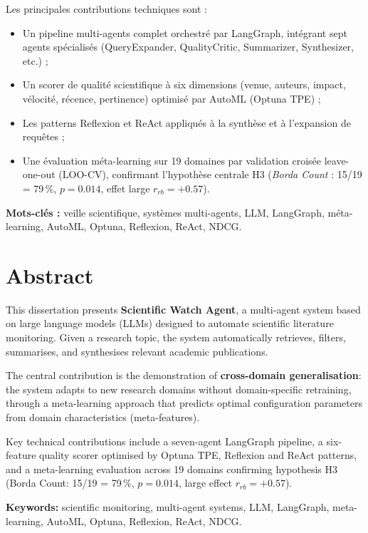 \documentclass[12pt,a4paper,twoside]{report}
\begin{document}
Les principales contributions techniques sont :
\begin{itemize}
  \item Un pipeline multi-agents complet orchestré par LangGraph, intégrant sept
    agents spécialisés (QueryExpander, QualityCritic, Summarizer, Synthesizer, etc.) ;
  \item Un scorer de qualité scientifique à six dimensions (venue, auteurs, impact,
    vélocité, récence, pertinence) optimisé par AutoML (Optuna TPE) ;
  \item Les patterns Reflexion et ReAct appliqués à la synthèse et à l'expansion
    de requêtes ;
  \item Une évaluation méta-learning sur 19 domaines par validation croisée
    leave-one-out (LOO-CV), confirmant l'hypothèse centrale H3
    (\textit{Borda Count} : 15/19 = 79\,\%, $p = 0.014$, effet large $r_{rb} = +0.57$).
\end{itemize}

\textbf{Mots-clés :} veille scientifique, systèmes multi-agents, LLM, LangGraph,
méta-learning, AutoML, Optuna, Reflexion, ReAct, NDCG.

\chapter*{Abstract}

This dissertation presents \textbf{Scientific Watch Agent}, a multi-agent system
based on large language models (LLMs) designed to automate scientific literature
monitoring. Given a research topic, the system automatically retrieves, filters,
summarises, and synthesises relevant academic publications.

The central contribution is the demonstration of \textbf{cross-domain generalisation}:
the system adapts to new research domains without domain-specific retraining,
through a meta-learning approach that predicts optimal configuration parameters
from domain characteristics (meta-features).

Key technical contributions include a seven-agent LangGraph pipeline, a six-feature
quality scorer optimised by Optuna TPE, Reflexion and ReAct patterns, and a
meta-learning evaluation across 19 domains confirming hypothesis H3
(Borda Count: 15/19 = 79\,\%, $p = 0.014$, large effect $r_{rb} = +0.57$).

\textbf{Keywords:} scientific monitoring, multi-agent systems, LLM, LangGraph,
meta-learning, AutoML, Optuna, Reflexion, ReAct, NDCG.
\end{document}

